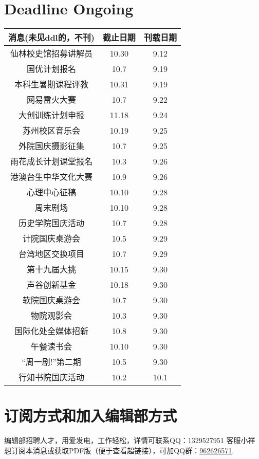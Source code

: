 \documentclass[letterpaper, 12pt]{article}
\begin{document}
\begin{multicols}{2}

\section{Deadline Ongoing}
\begin{tabular}{|c|c|c|}
    \hline
    消息(未见ddl的，不刊) & 截止日期 & 刊载日期\\
    \hline\hline
    仙林校史馆招募讲解员 & 10.30 & 9.12\\
    国优计划报名 & 10.7 & 9.19\\
    本科生暑期课程评教 & 10.31 & 9.19\\
    网易雷火大赛 & 10.7 & 9.22\\
    大创训练计划申报 & 11.18 & 9.24\\
    苏州校区音乐会 & 10.19 & 9.25\\
    外院国庆摄影征集 & 10.7 & 9.25\\
    雨花成长计划课堂报名 & 10.3 & 9.26\\
    港澳台生中华文化大赛 & 10.9 & 9.26\\
    心理中心征稿 & 10.10 & 9.28\\
    周末剧场 & 10.10 & 9.28\\
    历史学院国庆活动 & 10.7 & 9.28\\
    计院国庆桌游会 & 10.5 & 9.29\\
    台湾地区交换项目 & 10.7 & 9.29\\
    第十九届大挑 & 10.15 & 9.30\\
    声谷创新基金 & 10.18 & 9.30\\
    软院国庆桌游会 & 10.7 & 9.30\\
    物院观影会 & 10.3 & 9.30\\
    国际化处全媒体招新 & 10.8 & 9.30\\
    午餐读书会 & 10.10 & 9.30\\
    “周一剧!”第二期 & 10.5 & 9.30\\
    行知书院国庆活动 & 10.2 & 10.1\\
    \hline
\end{tabular}
\section{订阅方式和加入编辑部方式}
编辑部招聘人才，用爱发电，工作轻松，详情可联系QQ：1329527951 客服小祥\\想订阅本消息或获取PDF版（便于查看超链接），可加QQ群：\href{https://qm.qq.com/q/FGX1VYCrGS}{962626571}.

\end{multicols}
\end{document}
